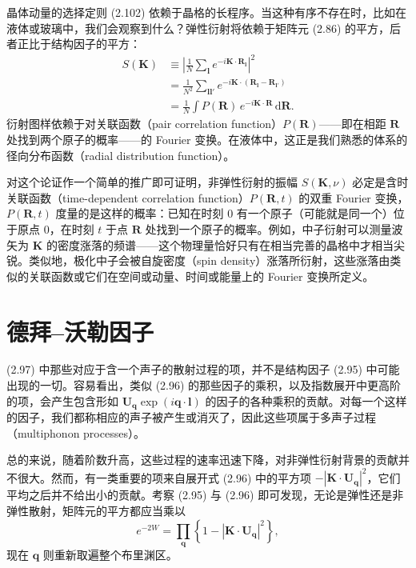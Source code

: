 晶体动量的选择定则 (2.102) 依赖于晶格的长程序。当这种有序不存在时，比如在液体或玻璃中，我们会观察到什么？弹性衍射将依赖于矩阵元 (2.86) 的平方，后者正比于结构因子的平方：
\begin{align*}
S(\mathbf{K}) &\equiv \left|\frac{1}{N}\sum_{\mathbf{l}} e^{-i\mathbf{K}\cdot\mathbf{R}_{\mathbf{l}}}\right|^{2}\\
&= \frac{1}{N^{2}}\sum_{\mathbf{l}\mathbf{l}'} e^{-i\mathbf{K}\cdot(\mathbf{R}_{\mathbf{l}}-\mathbf{R}_{\mathbf{l}'})}\\
&= \frac{1}{N}\int P(\mathbf{R})\,e^{-i\mathbf{K}\cdot\mathbf{R}}\,\mathrm{d}\mathbf{R}.
\tag{2.103}
\end{align*}
衍射图样依赖于对关联函数（pair correlation function）$P(\mathbf{R})$——即在相距 $\mathbf{R}$ 处找到两个原子的概率——的 Fourier 变换。在液体中，这正是我们熟悉的体系的径向分布函数（radial distribution function）。

对这个论证作一个简单的推广即可证明，非弹性衍射的振幅 $S(\mathbf{K},\nu)$ 必定是含时关联函数（time-dependent correlation function）$P(\mathbf{R},t)$ 的双重 Fourier 变换，$P(\mathbf{R},t)$ 度量的是这样的概率：已知在时刻 0 有一个原子（可能就是同一个）位于原点 0，在时刻 $t$ 于点 $\mathbf{R}$ 处找到一个原子的概率。例如，中子衍射可以测量波矢为 $\mathbf{K}$ 的密度涨落的频谱——这个物理量恰好只有在相当完善的晶格中才相当尖锐。类似地，极化中子会被自旋密度（spin density）涨落所衍射，这些涨落由类似的关联函数或它们在空间或动量、时间或能量上的 Fourier 变换所定义。

\section{德拜–沃勒因子}

(2.97) 中那些对应于含一个声子的散射过程的项，并不是结构因子 (2.95) 中可能出现的一切。容易看出，类似 (2.96) 的那些因子的乘积，以及指数展开中更高阶的项，会产生包含形如 $\mathbf{U}_{\mathbf{q}}\exp(i\mathbf{q}\cdot\mathbf{l})$ 的因子的各种乘积的贡献。对每一个这样的因子，我们都称相应的声子被产生或消灭了，因此这些项属于多声子过程（multiphonon processes）。

总的来说，随着阶数升高，这些过程的速率迅速下降，对非弹性衍射背景的贡献并不很大。然而，有一类重要的项来自展开式 (2.96) 中的平方项 $-|\mathbf{K}\cdot\mathbf{U}_{\mathbf{q}}|^{2}$，它们平均之后并不给出小的贡献。考察 (2.95) 与 (2.96) 即可发现，无论是弹性还是非弹性散射，矩阵元的平方都应当乘以
\begin{equation*}
e^{-2W}=\prod_{\mathbf{q}}\left\{1-|\mathbf{K}\cdot\mathbf{U}_{\mathbf{q}}|^{2}\right\},
\tag{2.104}
\end{equation*}
现在 $\mathbf{q}$ 则重新取遍整个布里渊区。

